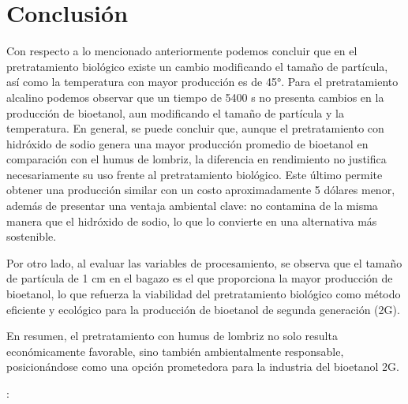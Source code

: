 \documentclass[12pt]{article}
\begin{document}


\newpage
		\section{Conclusión}
		Con respecto a lo mencionado anteriormente podemos concluir que en el pretratamiento biológico existe un cambio modificando el tamaño de partícula, así como la temperatura con mayor producción es de 45°.
		Para el pretratamiento alcalino podemos observar que un tiempo de  5400 s no presenta cambios en la producción de bioetanol, aun modificando el tamaño de partícula y la temperatura. En general, se puede concluir que, aunque el pretratamiento con hidróxido de sodio genera una mayor producción promedio de bioetanol en comparación con el humus de lombriz, la diferencia en rendimiento no justifica necesariamente su uso frente al pretratamiento biológico. Este último permite obtener una producción similar con un costo aproximadamente 5 dólares menor, además de presentar una ventaja ambiental clave: no contamina de la misma manera que el hidróxido de sodio, lo que lo convierte en una alternativa más sostenible.
		
		Por otro lado, al evaluar las variables de procesamiento, se observa que el tamaño de partícula de 1 cm en el bagazo es el que proporciona la mayor producción de bioetanol, lo que refuerza la viabilidad del pretratamiento biológico como método eficiente y ecológico para la producción de bioetanol de segunda generación (2G).
		
		En resumen, el pretratamiento con humus de lombriz no solo resulta económicamente favorable, sino también ambientalmente responsable, posicionándose como una opción prometedora para la industria del bioetanol 2G.
		
		
		
		
		
			
			
		
		\newpage
{}:
\end{document}
